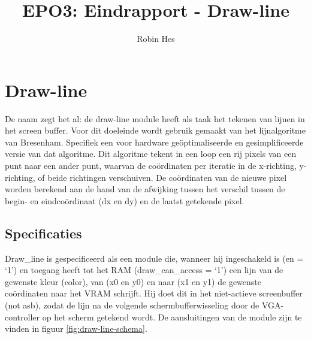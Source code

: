 \documentclass{scrartcl} %
\author{Robin Hes}
\title{EPO3: Eindrapport - Draw-line}
\begin{document}
\section{Draw-line}
\label{sec:draw-line}
De naam zegt het al: de draw-line module heeft als taak het tekenen van lijnen in het screen buffer. Voor dit doeleinde wordt gebruik gemaakt van het lijnalgoritme van Bresenham. Specifiek een voor hardware geöptimaliseerde en gesimplificeerde versie van dat algoritme. \cite{line-alg} Dit algoritme tekent in een loop een rij pixels van een punt naar een ander punt, waarvan de coördinaten per iteratie in de x-richting, y-richting, of beide richtingen verschuiven. De coördinaten van de nieuwe pixel worden berekend aan de hand van de afwijking tussen het verschil tussen de begin- en eindcoördinaat (dx en dy) en de laatst getekende pixel.

\subsection{Specificaties}
Draw\_line is gespecificeerd als een module die, wanneer hij ingeschakeld is (en = `1') en toegang heeft tot het RAM (draw\_can\_access = `1') een lijn van de gewenste kleur (color), van (x0 en y0) en naar (x1 en y1) de gewenste coördinaten naar het VRAM schrijft. Hij doet dit in het niet-actieve screenbuffer (not asb), zodat de lijn na de volgende schermbufferwisseling door de VGA-controller op het scherm getekend wordt. De aansluitingen van de module zijn te vinden in figuur \ref{fig:draw-line-schema}.
\end{document}
